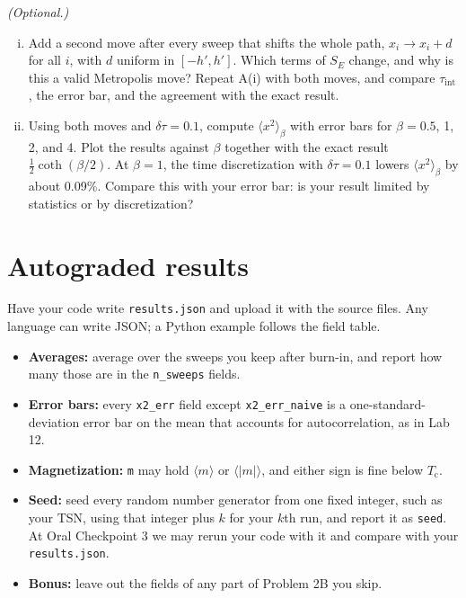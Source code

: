 \begin{solution}
\end{solution}

\begin{problem}[10 bonus]
  \emph{(Optional.)}
  \begin{enumerate}[(i)]
    \item Add a second move after every sweep that shifts the whole path, $x_i \to x_i + d$ for all $i$, with $d$ uniform in $[-h', h']$.
          Which terms of $S_E$ change, and why is this a valid Metropolis move?
          Repeat A(i) with both moves, and compare $\tau_\mathrm{int}$, the error bar, and the agreement with the exact result.
    \item Using both moves and $\delta\tau = 0.1$, compute $\langle x^2\rangle_\beta$ with error bars for $\beta = 0.5$, 1, 2, and 4.
          Plot the results against $\beta$ together with the exact result $\frac{1}{2}\coth(\beta/2)$.
          At $\beta = 1$, the time discretization with $\delta\tau = 0.1$ lowers $\langle x^2\rangle_\beta$ by about 0.09\%.
          Compare this with your error bar: is your result limited by statistics or by discretization?
  \end{enumerate}
\end{problem}

\begin{solution}
\end{solution}

\newpage
\section*{Autograded results}
Have your code write \texttt{results.json} and upload it with the source files.
Any language can write JSON; a Python example follows the field table.

\begin{itemize}
  \item \textbf{Averages:} average over the sweeps you keep after burn-in, and report how many those are in the \texttt{n\_sweeps} fields.
  \item \textbf{Error bars:} every \texttt{x2\_err} field except \texttt{x2\_err\_naive} is a one-standard-deviation error bar on the mean that accounts for autocorrelation, as in Lab 12.
  \item \textbf{Magnetization:} \texttt{m} may hold $\langle m\rangle$ or $\langle |m|\rangle$, and either sign is fine below $T_\mathrm{c}$.
  \item \textbf{Seed:} seed every random number generator from one fixed integer, such as your TSN, using that integer plus $k$ for your $k$th run, and report it as \texttt{seed}.
        At Oral Checkpoint 3 we may rerun your code with it and compare with your \texttt{results.json}.
  \item \textbf{Bonus:} leave out the fields of any part of Problem 2B you skip.
\end{itemize}


